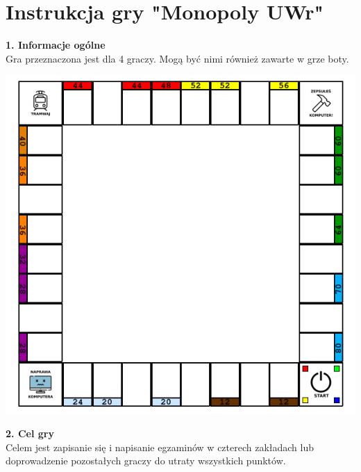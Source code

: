 \documentclass[a4paper]{article}
\author{}
\title{}
\date{\today}
\begin{document}
\section*{Instrukcja gry "Monopoly UWr"}

\noindent \textbf{1. Informacje ogólne}\\
\noindent Gra przeznaczona jest dla 4 graczy. Mogą być nimi również zawarte w grze boty.
\vspace{10pt}

\includegraphics[scale=0.6]{board.png}

\noindent \textbf{2. Cel gry}\\
\noindent Celem jest zapisanie się i napisanie egzaminów w czterech zakładach lub doprowadzenie pozostałych graczy do utraty wszystkich punktów.
\vspace{10pt}
\end{document}
